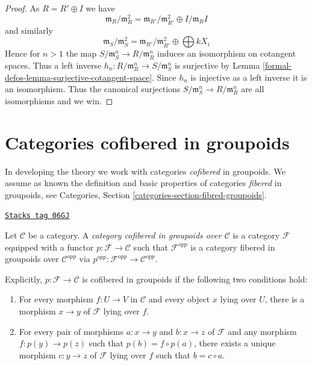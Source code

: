\begin{proof}
As $R = R' \oplus I$ we have
$$
\mathfrak m_R/\mathfrak m_R^2 =
\mathfrak m_{R'}/\mathfrak m_{R'}^2 \oplus I/\mathfrak m_RI
$$
and similarly
$$
\mathfrak m_S/\mathfrak m_S^2 =
\mathfrak m_{R'}/\mathfrak m_{R'}^2 \oplus \bigoplus kX_i
$$
Hence for $n > 1$ the map $S/\mathfrak m_S^n \to R/\mathfrak m_R^n$
induces an isomorphism on cotangent spaces. Thus a left inverse
$h_n : R/\mathfrak m_R^n \to S/\mathfrak m_S^n$ is surjective by
Lemma \ref{formal-defos-lemma-surjective-cotangent-space}.
Since $h_n$ is injective as a left inverse it is an isomorphism.
Thus the canonical surjections $S/\mathfrak m_S^n \to R/\mathfrak m_R^n$
are all isomorphisms and we win.
\end{proof}

\section{Categories cofibered in groupoids}
\label{formal-defos-section-preliminary}
In developing the theory we work with categories {\it cofibered} in groupoids.
 We assume as known the definition and basic properties of categories
{\it fibered} in groupoids, see
Categories, Section \ref{categories-section-fibred-groupoids}.

\begin{definition}
\label{formal-defos-definition-category-cofibred-groupoids}
\href{https://stacks.math.columbia.edu/tag/06GJ}{\texttt{Stacks tag 06GJ}}

Let $\mathcal{C}$ be a category.  A {\it category cofibered in groupoids over
$\mathcal{C}$} is a category $\mathcal{F}$ equipped with a functor
$p: \mathcal{F} \to \mathcal{C}$ such that $\mathcal{F}^{opp}$ is a category
fibered in groupoids over $\mathcal{C}^{opp}$ via
$p^{opp}: \mathcal{F}^{opp} \to \mathcal{C}^{opp}$.
\end{definition}

Explicitly, $p: \mathcal{F} \to \mathcal{C}$ is cofibered in groupoids if
the following two conditions hold:
\begin{enumerate}
\item For every morphism $f: U \to V$ in $\mathcal{C}$ and every object
$x$ lying over $U$, there is a morphism $x \to y$ of $\mathcal{F}$ lying
over $f$.
\item For every pair of morphisms $a: x \to y$ and $b: x \to z$
of $\mathcal{F}$ and any morphism $f: p(y) \to p(z)$ such that $p(b) = f
\circ p(a)$, there exists a unique morphism $c: y \to z$ of $\mathcal
F$ lying over $f$ such that $b = c \circ a$.
\end{enumerate}

